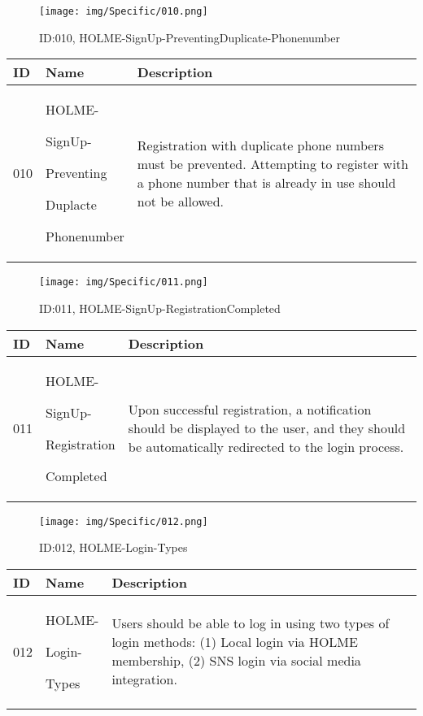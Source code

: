 \documentclass[conference]{IEEEtran}
\begin{document}
\begin{enumerate}
\begin{figure}[h]
\centering
\texttt{[image: img/Specific/010.png]}
\caption{ID:010, HOLME-SignUp-PreventingDuplicate-Phonenumber}
\end{figure}
\begin{table}[h]
\def\arraystretch{1.2} \small
    \begin{tabular}{|p{1cm}|p{1.8cm}|p{5.0cm}|}
        \hline
        ID & Name & Description\\ \hline
         010 \par  & HOLME-\par SignUp-\par Preventing \par Duplacte \par Phonenumber &Registration with duplicate phone numbers must be prevented. Attempting to register with a phone number that is already in use should not be allowed.\\ \hline
	\end{tabular}
\end{table}

\begin{figure}[h]
\centering
\texttt{[image: img/Specific/011.png]}
\caption{ID:011, HOLME-SignUp-RegistrationCompleted}
\end{figure}
\begin{table}[h]
\def\arraystretch{1.2} \small
    \begin{tabular}{|p{1cm}|p{1.8cm}|p{5.0cm}|}
        \hline
        ID & Name & Description\\ \hline
         011 \par  & HOLME-\par SignUp-\par Registration \par Completed &Upon successful registration, a notification should be displayed to the user, and they should be automatically redirected to the login process.\\ \hline
	\end{tabular}
\end{table}
\clearpage

\begin{figure}[h]
\centering
\texttt{[image: img/Specific/012.png]}
\caption{ID:012, HOLME-Login-Types}
\end{figure}
\begin{table}[h]
\def\arraystretch{1.2} \small
    \begin{tabular}{|p{1cm}|p{1.8cm}|p{5.0cm}|}
        \hline
        ID & Name & Description\\ \hline
         012 \par  & HOLME-\par Login-\par Types &Users should be able to log in using two types of login methods:
(1) Local login via HOLME membership, (2) SNS login via social media integration.\\ \hline
	\end{tabular}
\end{table}


\end{enumerate}
\end{document}

